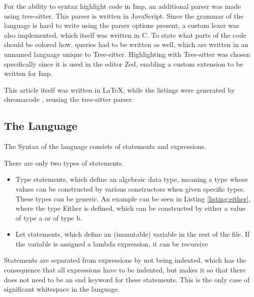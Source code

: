 \documentclass[12pt]{article}
\newcommand{\importListing}[1]{
    \begin{minipage}{\textwidth}
    
    \end{minipage}
}
\begin{document}
For the ability to syntax highlight code in Imp, an additional parser was made using tree-sitter.
This parser is written in JavaScript. Since the grammar of the language is hard to write using
the parser options present, a custom lexer was also implemented, which itself was written in C.
To state what parts of the code should be colored how, queries had to be written as well,
which are written in an unnamed language unique to Tree-sitter.
Highlighting with Tree-sitter was chosen specifically since it is used
in the editor Zed, enabling a custom extension to be written for Imp.

This article itself was written in LaTeX, while the listings were generated
by chromacode \autocite{lebedaTomLebedaChroma_code2025}, reusing the tree-sitter parser.


\subsection{The Language}
\importListing{code/either.tex}

The Syntax of the language consists of statements and expressions.

There are only two types of statements.
\begin{itemize}
	\item Type statements, which define an algebraic data type,
	      meaning a type whose values can be constructed by various
	      constructors when given specific types.
	      These types can be generic.
	      An example can be seen in Listing \ref{listing:either}, where the type Either is defined,
	      which can be constructed by either a value of type a or of type b.
	\item Let statements, which define an (immutable) variable
	      in the rest of the file. If the variable is assigned a
	      lambda expression, it can be recursive
\end{itemize}
Statements are separated from expressions by not being indented,
which has the consequence that all expressions have to be indented,
but makes it so that there does not need to be an end keyword
for these statements.
This is the only case of significant whitespace in the language.
\end{document}

